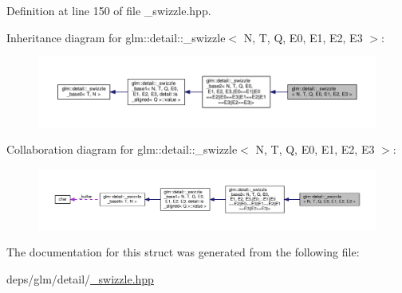 Definition at line 150 of file \+\_\+swizzle.\+hpp.



Inheritance diagram for glm\+:\+:detail\+:\+:\+\_\+swizzle$<$ N, T, Q, E0, E1, E2, E3 $>$\+:
\nopagebreak
\begin{figure}[H]
\begin{center}
\leavevmode
\includegraphics[width=350pt]{dd/dee/structglm_1_1detail_1_1__swizzle__inherit__graph}
\end{center}
\end{figure}


Collaboration diagram for glm\+:\+:detail\+:\+:\+\_\+swizzle$<$ N, T, Q, E0, E1, E2, E3 $>$\+:
\nopagebreak
\begin{figure}[H]
\begin{center}
\leavevmode
\includegraphics[width=350pt]{d6/d20/structglm_1_1detail_1_1__swizzle__coll__graph}
\end{center}
\end{figure}


The documentation for this struct was generated from the following file\+:\begin{DoxyCompactItemize}
\item 
deps/glm/detail/\hyperlink{__swizzle_8hpp}{\+\_\+swizzle.\+hpp}\end{DoxyCompactItemize}
